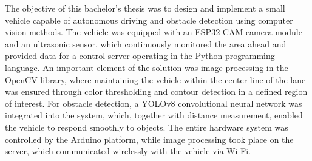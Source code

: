 The objective of this bachelor's thesis was to design and implement a small vehicle capable of autonomous driving and obstacle detection using computer vision methods. The vehicle was equipped with an ESP32-CAM camera module and an ultrasonic sensor, which continuously monitored the area ahead and provided data for a control server operating in the Python programming language. An important element of the solution was image processing in the OpenCV library, where maintaining the vehicle within the center line of the lane was ensured through color thresholding and contour detection in a defined region of interest. For obstacle detection, a YOLOv8 convolutional neural network was integrated into the system, which, together with distance measurement, enabled the vehicle to respond smoothly to objects. The entire hardware system was controlled by the Arduino platform, while image processing took place on the server, which communicated wirelessly with the vehicle via Wi-Fi.
